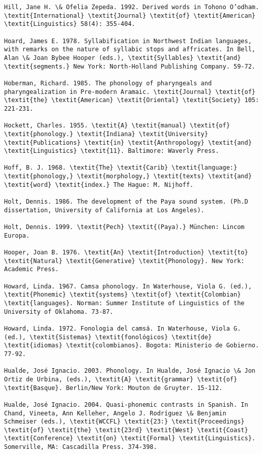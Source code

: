 \begin{verbatim}
Hill, Jane H. \& Ofelia Zepeda. 1992. Derived words in Tohono O’odham. \textit{International} \textit{Journal} \textit{of} \textit{American} \textit{Linguistics} 58(4): 355-404.

Hoard, James E. 1978. Syllabification in Northwest Indian languages, with remarks on the nature of syllabic stops and affricates. In Bell, Alan \& Joan Bybee Hooper (eds.), \textit{Syllables} \textit{and} \textit{segments.} New York: North-Holland Publishing Company. 59-72.

Hoberman, Richard. 1985. The phonology of pharyngeals and pharyngealization in Pre-modern Aramaic. \textit{Journal} \textit{of} \textit{the} \textit{American} \textit{Oriental} \textit{Society} 105: 221-231.

Hockett, Charles. 1955. \textit{A} \textit{manual} \textit{of} \textit{phonology.} \textit{Indiana} \textit{University} \textit{Publications} \textit{in} \textit{Anthropology} \textit{and} \textit{Linguistics} \textit{11}. Baltimore: Waverly Press.

Hoff, B. J. 1968. \textit{The} \textit{Carib} \textit{language:} \textit{phonology,} \textit{morphology,} \textit{texts} \textit{and} \textit{word} \textit{index.} The Hague: M. Nijhoff.

Holt, Dennis. 1986. The development of the Paya sound system. (Ph.D dissertation, University of California at Los Angeles).

Holt, Dennis. 1999. \textit{Pech} \textit{(Paya).} München: Lincom Europa.

Hooper, Joan B. 1976. \textit{An} \textit{Introduction} \textit{to} \textit{Natural} \textit{Generative} \textit{Phonology}. New York: Academic Press.

Howard, Linda. 1967. Camsa phonology. In Waterhouse, Viola G. (ed.), \textit{Phonemic} \textit{systems} \textit{of} \textit{Colombian} \textit{languages}. Norman: Summer Institute of Linguistics of the University of Oklahoma. 73-87.

Howard, Linda. 1972. Fonologia del camsá. In Waterhouse, Viola G. (ed.), \textit{Sistemas} \textit{fonológicos} \textit{de} \textit{idiomas} \textit{colombianos}. Bogota: Ministerio de Gobierno. 77-92.

Hualde, José Ignacio. 2003. Phonology. In Hualde, José Ignacio \& Jon Ortiz de Urbina, (eds.), \textit{A} \textit{grammar} \textit{of} \textit{Basque}. Berlin/New York: Mouton de Gruyter. 15-112.

Hualde, José Ignacio. 2004. Quasi-phonemic contrasts in Spanish. In Chand, Vineeta, Ann Kelleher, Angelo J. Rodríguez \& Benjamin Schmeiser (eds.), \textit{WCCFL} \textit{23:} \textit{Proceedings} \textit{of} \textit{the} \textit{23rd} \textit{West} \textit{Coast} \textit{Conference} \textit{on} \textit{Formal} \textit{Linguistics}. Somerville, MA: Cascadilla Press. 374-398.


\end{verbatim}

